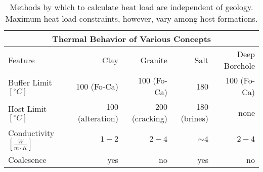 %
\begin{table}[h!]
  \centering
  \footnotesize{
  \begin{tabular}{|l|r|r|r|r|}
    \multicolumn{5}{c}{\textbf{Thermal Behavior of Various Concepts}}\\
    \hline
    Feature & Clay & Granite & Salt & Deep Borehole \\ 
    \hline
    Buffer Limit $[^{\circ}C]$ & 100 (Fo-Ca) & 100 (Fo-Ca) & 180 & 100 (Fo-Ca) \\ 
    Host Limit $[^{\circ}C]$   & 100 (alteration)  & 200 (cracking) & 180 (brines) & none \\ 
    Conductivity $[\frac{W}{m{\cdot}K}]$ & $1-2$ & $2-4$ & $\sim4$  & $2-4$ \\ 
    Coalesence & yes & no & yes & no \\ 
    \hline
  \end{tabular}
  \caption[Models for Heat Transport for Various Geologies]{Methods by which to calculate heat 
  load are independent of geology. Maximum heat load constraints, however, vary among host formations. }
  }
  \label{tab:heat_tab}
\end{table}
